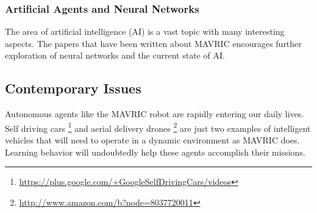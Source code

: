 \documentclass{article}
\begin{document}
                \subsubsection{Artificial Agents and Neural Networks}
                    The area of artificial intelligence (AI) is a vast topic
                    with many interesting aspects.
                    The papers that have been written about MAVRIC encourages 
                    further exploration of neural networks and the current state of AI.
            
        \subsection{Contemporary Issues}
        
            Autonomous agents like the MAVRIC robot are rapidly entering our daily lives.
            Self driving cars%
            \footnote{\url{https://plus.google.com/+GoogleSelfDrivingCars/videos}}
            and aerial delivery drones%
            \footnote{\url{http://www.amazon.com/b?node=8037720011}}
            are just two examples of intelligent
            vehicles that will need to operate in a dynamic environment as MAVRIC does.
            Learning behavior will undoubtedly help these agents accomplish their missions.
        
        
\clearpage


\end{document}
